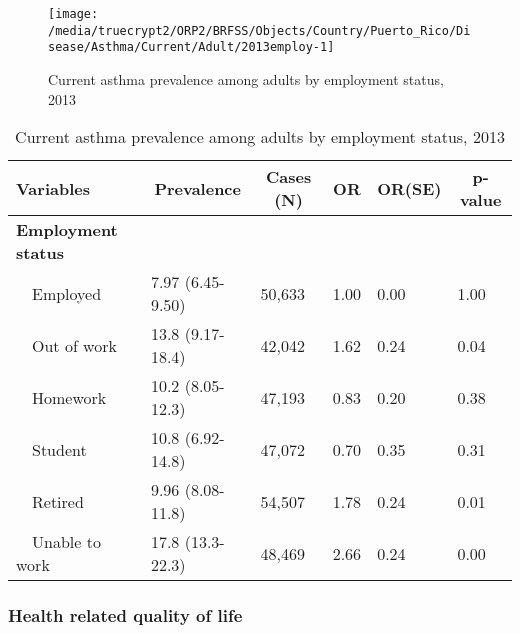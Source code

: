 \begin{figure}[H]
\caption{Current asthma prevalence among adults by employment status, 
         2013}
\label{fig:employ.Asthma.2013}
\begin{knitrout}
\color{fgcolor}

{\centering \texttt{[image: /media/truecrypt2/ORP2/BRFSS/Objects/Country/Puerto\_Rico/Disease/Asthma/Current/Adult/2013employ-1]} 

}



\end{knitrout}
 \end{figure}

\begin{table}[H]
\caption{Current asthma prevalence  among adults by employment status, 2013\label{tab:employ.Asthma.2013}} 
\begin{center}
\begin{tabular}{llllll}
\hline\hline
\multicolumn{1}{l}{Variables}&\multicolumn{1}{c}{Prevalence}&\multicolumn{1}{c}{Cases (N)}&\multicolumn{1}{c}{OR}&\multicolumn{1}{c}{OR(SE)}&\multicolumn{1}{c}{p-value}\tabularnewline
\hline
{\bfseries Employment status}&&&&&\tabularnewline
~~Employed&7.97 (6.45-9.50)&50,633&1.00&0.00&1.00\tabularnewline
~~Out of work&13.8 (9.17-18.4)&42,042&1.62&0.24&0.04\tabularnewline
~~Homework&10.2 (8.05-12.3)&47,193&0.83&0.20&0.38\tabularnewline
~~Student&10.8 (6.92-14.8)&47,072&0.70&0.35&0.31\tabularnewline
~~Retired&9.96 (8.08-11.8)&54,507&1.78&0.24&0.01\tabularnewline
~~Unable to work&17.8 (13.3-22.3)&48,469&2.66&0.24&0.00\tabularnewline
\hline
\end{tabular}\end{center}

\end{table}


 \newpage
\subsubsection{Health related quality of life}


